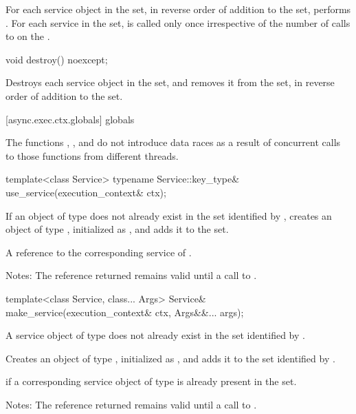 \begin{itemdescr}
\pnum
\effects For each service object  in the  set, in reverse order of addition to the set, performs . For each service in the set,  is called only once irrespective of the number of calls to  on the .
\end{itemdescr}

\begin{itemdecl}
void destroy() noexcept;
\end{itemdecl}

\begin{itemdescr}
\pnum
\effects Destroys each service object in the  set, and removes it from the set, in reverse order of addition to the set.
\end{itemdescr}



[async.exec.ctx.globals]{ globals}

\pnum
The functions , , and  do not introduce data races as a result of concurrent calls to those functions from different threads.

\begin{itemdecl}
template<class Service> typename Service::key_type&
  use_service(execution_context& ctx);
\end{itemdecl}

\begin{itemdescr}
\pnum
\effects If an object of type  does not already exist in the  set identified by , creates an object of type , initialized as , and adds it to the set.

\pnum
\returns A reference to the corresponding service of .

\pnum
Notes: The reference returned remains valid until a call to .
\end{itemdescr}

\begin{itemdecl}
template<class Service, class... Args> Service&
  make_service(execution_context& ctx, Args&&... args);
\end{itemdecl}

\begin{itemdescr}
\pnum
\requires A service object of type  does not already exist in the  set identified by .

\pnum
\effects Creates an object of type , initialized as , and adds it to the  set identified by .

\pnum
\remarks {} if a corresponding service object of type  is already present in the set.

\pnum
Notes: The reference returned remains valid until a call to .
\end{itemdescr}

